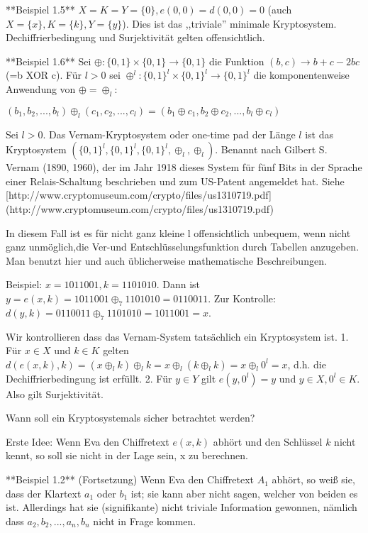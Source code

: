 \documentclass[a4paper]{article}
\begin{document}
\begin{multicols}{3}
    **Beispiel 1.5** $X=K=Y=\{0\},e(0,0)=d(0,0)=0$ (auch $X=\{x\},K=\{k\},Y=\{y\}$). Dies ist das ,,triviale'' minimale Kryptosystem. Dechiffrierbedingung und Surjektivität gelten offensichtlich.

    **Beispiel 1.6** Sei $\oplus:\{0,1\}\times\{0,1\}\rightarrow\{0,1\}$ die Funktion $(b,c)\rightarrow b+c-2bc$ (=b XOR c).
    Für $l>0$ sei $\oplus^l:\{0,1\}^l\times\{0,1\}^l\rightarrow\{0,1\}^l$ die komponentenweise Anwendung von $\oplus=\oplus_l$:

    $(b_1,b_2,...,b_l)\oplus_l(c_1,c_2,...,c_l) = (b_1\oplus c_1,b_2\oplus c_2,...,b_l\oplus c_l)$

    Sei $l>0$. Das Vernam-Kryptosystem oder one-time pad der Länge $l$ ist das Kryptosystem $(\{0,1\}^l,\{0,1\}^l,\{0,1\}^l,\oplus_l,\oplus_l)$. Benannt nach Gilbert S. Vernam (1890, 1960), der im Jahr 1918 dieses System für fünf Bits in der Sprache einer Relais-Schaltung beschrieben und zum US-Patent angemeldet hat. Siehe [http://www.cryptomuseum.com/crypto/files/us1310719.pdf](http://www.cryptomuseum.com/crypto/files/us1310719.pdf)

    In diesem Fall ist es für nicht ganz kleine l offensichtlich unbequem, wenn nicht ganz unmöglich,die Ver-und Entschlüsselungsfunktion durch Tabellen anzugeben. Man benutzt hier und auch üblicherweise mathematische Beschreibungen.

    Beispiel: $x=1011001,k=1101010$. Dann ist $y=e(x,k)=1011001\oplus_7 1101010 = 0110011$. Zur Kontrolle: $d(y,k) = 0110011\oplus_7 1101010 = 1011001 =x$.

    Wir kontrollieren dass das Vernam-System tatsächlich ein Kryptosystem ist.
    1. Für $x\in X$ und $k\in K$ gelten $d(e(x,k),k)=(x\oplus_l k)\oplus_l k=x\oplus_l(k\oplus_l k) =x\oplus_l 0^l=x$, d.h. die Dechiffrierbedingung ist erfüllt.
    2. Für $y\in Y$ gilt $e(y,0^l) =y$ und $y\in X,0^l\in K$. Also gilt Surjektivität.

    Wann soll ein Kryptosystemals sicher betrachtet werden?

    Erste Idee: Wenn Eva den Chiffretext $e(x,k)$ abhört und den Schlüssel $k$ nicht kennt, so soll sie nicht in der Lage sein, x zu berechnen.

    **Beispiel 1.2** (Fortsetzung) Wenn Eva den Chiffretext $A_1$ abhört, so weiß sie, dass der Klartext $a_1$ oder $b_1$ ist; sie kann aber nicht sagen, welcher von beiden es ist. Allerdings hat sie (signifikante) nicht triviale Information gewonnen, nämlich dass $a_2,b_2,...,a_n,b_n$ nicht in Frage kommen.


\end{multicols}
\end{document}
